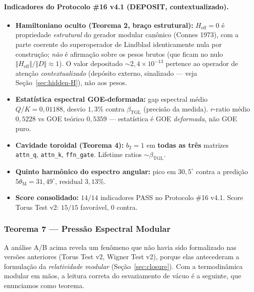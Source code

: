 \documentclass[12pt,a4paper]{article}
\newcommand{\betatgl}{\beta_{\text{TGL}}}
\newcommand{\thetaM}{\theta_{\text{M}}}
\begin{document}
\paragraph{Indicadores do Protocolo \#16 v4.1 (DEPOSIT, contextualizado).}
\begin{itemize}[leftmargin=*]
\item \textbf{Hamiltoniano oculto (Teorema 2, braço estrutural):}
$H_{\text{eff}}=0$ é propriedade \emph{estrutural} do gerador modular
canônico (Connes 1973), com a parte coerente do superoperador de Lindblad
identicamente nula por construção; \emph{não} é afirmação sobre os pesos
brutos (que ficam no nulo $\Vert H_{\text{eff}}\Vert/\Vert D\Vert\approx 1$).
O valor depositado $\sim 2{,}4\times10^{-13}$ pertence ao operador de atenção
\emph{contextualizado} (depósito externo, sinalizado --- veja
Seção~\ref{sec:hidden-H}), não aos pesos.

\item \textbf{Estatística espectral GOE-deformada:}
gap espectral médio $Q/K = 0{,}01188$, desvio
$1{,}3\%$ contra $\betatgl$ (precisão da medida).
$r$-ratio médio $0{,}5228$ vs GOE teórico $0{,}5359$ ---
estatística é GOE \emph{deformada}, não GOE puro.

\item \textbf{Cavidade toroidal (Teorema 4):} $b_{2} = 1$ em
\textbf{todas as três} matrizes \texttt{attn\_q}, \texttt{attn\_k},
\texttt{ffn\_gate}.  Lifetime ratios $\sim \betatgl$.

\item \textbf{Quinto harmônico do espectro angular:} pico em $30{,}5^{\circ}$
contra a predição $5\thetaM = 31{,}49^{\circ}$, residual $3{,}13$\%.

\item \textbf{Score consolidado:} $14/14$ indicadores PASS no Protocolo
\#16 v4.1.  Score Torus Test v2: $15/15$ favorável, $0$ contra.
\end{itemize}

\subsubsection{Teorema 7 --- Pressão Espectral Modular}
\label{sec:pressure}

A análise A/B acima revela um fenômeno que não havia sido formalizado nas
versões anteriores (Torus Test v2, Wigner Test v2), porque elas antecederam
a formulação da \emph{relatividade modular} (Seção~\ref{sec:closure}).  Com
a termodinâmica modular em mãos, a leitura correta do esvaziamento de vácuo
é a seguinte, que enunciamos como teorema.
\end{document}
